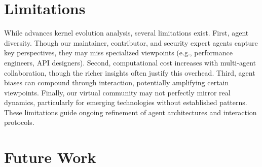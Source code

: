 \section{Limitations}
\label{sec:limitations}

While \sys advances kernel evolution analysis, several limitations exist. First, agent diversity. Though our maintainer, contributor, and security expert agents capture key perspectives, they may miss specialized viewpoints (e.g., performance engineers, API designers). Second, computational cost increases with multi-agent collaboration, though the richer insights often justify this overhead. Third, agent biases can compound through interaction, potentially amplifying certain viewpoints. Finally, our virtual community may not perfectly mirror real dynamics, particularly for emerging technologies without established patterns. These limitations guide ongoing refinement of agent architectures and interaction protocols.

\section{Future Work}
\label{sec:future}

